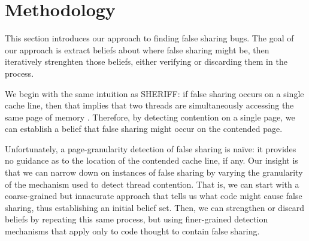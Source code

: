 \documentclass{sig-alternate}
\begin{document}
%





\section{Methodology}\label{sec:methodology}

This section introduces our approach to finding false sharing bugs. The goal of our approach is extract beliefs about
where false sharing might be, then iteratively strenghten those beliefs, either verifying or discarding them in the process.

We begin with the same intuition as SHERIFF: if false sharing occurs on a single cache line, then that implies that two
threads are simultaneously accessing the same page of memory \cite{SHERIFF}. Therefore, by detecting contention on
a single page, we can establish a belief that false sharing might occur on the contended page.

Unfortunately, a page-granularity detection of false sharing is na{\"i}ve: it provides no guidance as to the location of the
contended cache line, if any. Our insight is that we can narrow down on instances of false sharing by varying the
granularity of the mechanism used to detect thread contention. That is, we can start with a coarse-grained but
innacurate approach that tells us what code might cause false sharing, thus establishing an initial belief set. Then, we
can strengthen or discard beliefs by repeating this same process, but using finer-grained detection mechanisms that
apply only to code thought to contain false sharing.
\end{document}
